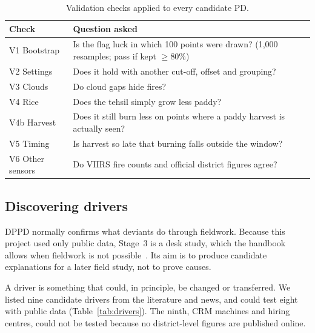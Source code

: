 \documentclass[sigconf,nonacm]{acmart}
\begin{document}
\begin{table}[t]
\caption{Validation checks applied to every candidate PD.}
\label{tab:checks}
\small
\begin{tabularx}{\columnwidth}{@{}l >{\raggedright\arraybackslash}X@{}}
\toprule
Check & Question asked \\
\midrule
V1 Bootstrap & Is the flag luck in which 100 points were drawn? (1,000 resamples; pass if kept $\geq$80\%) \\
V2 Settings & Does it hold with another cut-off, offset and grouping? \\
V3 Clouds & Do cloud gaps hide fires? \\
V4 Rice & Does the tehsil simply grow less paddy? \\
V4b Harvest & Does it still burn less on points where a paddy harvest is actually seen? \\
V5 Timing & Is harvest so late that burning falls outside the window? \\
V6 Other sensors & Do VIIRS fire counts and official district figures agree? \\
\bottomrule
\end{tabularx}
\end{table}

\subsection{Discovering drivers}
\label{sec:drivers}

DPPD normally confirms what deviants do through fieldwork. Because this project used only public data, Stage~3 is a desk study, which the handbook allows when fieldwork is not possible~\cite{dppd2021handbook}. Its aim is to produce candidate explanations for a later field study, not to prove causes.

A driver is something that could, in principle, be changed or transferred. We listed nine candidate drivers from the literature and news, and could test eight with public data (Table~\ref{tab:drivers}). The ninth, CRM machines and hiring centres, could not be tested because no district-level figures are published online.
\end{document}
